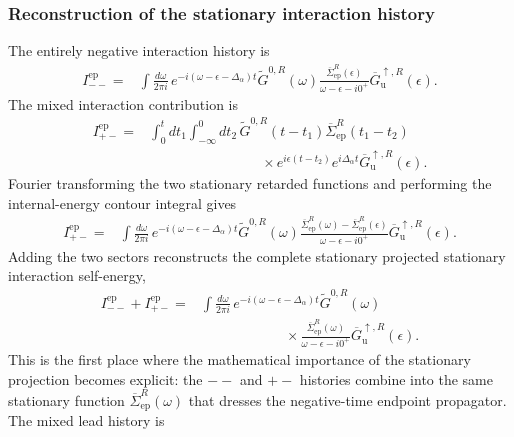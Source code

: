 \documentclass[
 reprint,
 superscriptaddress,
 amsmath,amssymb,
 aps,prb,
 longbibliography,
 floatfix
]{revtex4-2}
\newcommand{\ep}{\mathrm{ep}}
\newcommand{\barSigma}{\overline{\Sigma}}
\begin{document}
\subsubsection{Reconstruction of the stationary interaction history}

The entirely negative interaction history is
\begin{equation*}
\begin{aligned}
I_{--}^{\ep}
={}&
\int\frac{d\omega}{2\pi i}\,
e^{-i(\omega-\epsilon-\Delta_\alpha)t}
\widetilde G^{0,R}(\omega)
\frac{\barSigma_{\ep}^R(\epsilon)}
{\omega-\epsilon-i0^+}
\overline G_{\mathrm u}^{\uparrow,R}(\epsilon).
\end{aligned}
\end{equation*}
The mixed interaction contribution is
\begin{align*}
I_{+-}^{\ep}
={}&
\int_0^t dt_1
\int_{-\infty}^{0}dt_2\,
\widetilde G^{0,R}(t-t_1)
\barSigma_{\ep}^R(t_1-t_2)
\\
&\qquad\qquad\qquad\qquad\times
e^{i\epsilon(t-t_2)}
e^{i\Delta_\alpha t}
\overline G_{\mathrm u}^{\uparrow,R}(\epsilon).
\end{align*}
Fourier transforming the two stationary retarded functions and performing the internal-energy contour integral gives
\begin{equation*}
\begin{aligned}
I_{+-}^{\ep}
={}&
\int\frac{d\omega}{2\pi i}\,
e^{-i(\omega-\epsilon-\Delta_\alpha)t}
\widetilde G^{0,R}(\omega)
\frac{
\barSigma_{\ep}^R(\omega)
-
\barSigma_{\ep}^R(\epsilon)}
{\omega-\epsilon-i0^+}
\overline G_{\mathrm u}^{\uparrow,R}(\epsilon).
\end{aligned}
\end{equation*}
Adding the two sectors reconstructs the complete stationary projected stationary interaction self-energy,
\begin{equation*}
\begin{aligned}
I_{--}^{\ep}+I_{+-}^{\ep}
={}&
\int\frac{d\omega}{2\pi i}\,
e^{-i(\omega-\epsilon-\Delta_\alpha)t}
\widetilde G^{0,R}(\omega)
\\
&\qquad\qquad\qquad\times
\frac{\barSigma_{\ep}^R(\omega)}
{\omega-\epsilon-i0^+}
\overline G_{\mathrm u}^{\uparrow,R}(\epsilon).
\end{aligned}
\end{equation*}
This is the first place where the mathematical importance of the stationary projection becomes explicit: the $--$ and $+-$ histories combine into the same stationary function $\barSigma_{\ep}^R(\omega)$ that dresses the negative-time endpoint propagator. The mixed lead history is
\end{document}

